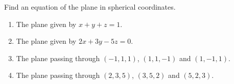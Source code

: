 Find an equation of the plane in spherical coordinates.

\begin{enumerate}
\item The plane given by $x+y+z=1$.
\item The plane given by $2x+3y-5z=0$.
\item The plane passing through $(-1, 1, 1)$, $(1, 1, -1)$ and $(1, -1, 1)$.
\item The plane passing through $(2,3,5 )$, $(3, 5, 2)$ and $(5, 2, 3)$.
\end{enumerate}